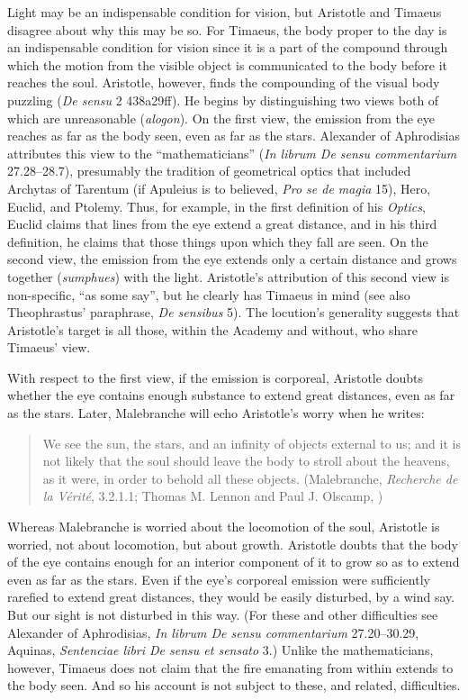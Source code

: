 Light may be an indispensable condition for vision, but Aristotle and Timaeus disagree about why this may be so. For Timaeus, the body proper to the day is an indispensable condition for vision since it is a part of the compound through which the motion from the visible object is communicated to the body before it reaches the soul. Aristotle, however, finds the compounding of the visual body puzzling (\emph{De sensu} 2 438a29ff). He begins by distinguishing two views both of which are unreasonable (\emph{alogon}). On the first view, the emission from the eye reaches as far as the body seen, even as far as the stars. Alexander of Aphrodisias attributes this view to the ``mathematicians'' (\emph{In librum De sensu commentarium} 27.28--28.7), presumably the tradition of geometrical optics that included Archytas of Tarentum (if Apuleius is to believed, \emph{Pro se de magia} 15), Hero, Euclid, and Ptolemy. Thus, for example, in the first definition of his \emph{Optics}, Euclid claims that lines from the eye extend a great distance, and in his third definition, he claims that those things upon which they fall are seen. On the second view, the emission from the eye extends only a certain distance and grows together (\emph{sumphues}) with the light. Aristotle's attribution of this second view is non-specific, ``as some say'', but he clearly has Timaeus in mind (see also Theophrastus' paraphrase, \emph{De sensibus} 5). The locution's generality suggests that Aristotle's target is all those, within the Academy and without, who share Timaeus' view.

With respect to the first view, if the emission is corporeal, Aristotle doubts whether the eye contains enough substance to extend great distances, even as far as the stars. Later, Malebranche will echo Aristotle's worry when he writes:
\begin{quote}
	We see the sun, the stars, and an infinity of objects external to us; and it is not likely that the soul should leave the body to stroll about the heavens, as it were, in order to behold all these objects. (Malebranche, \emph{Recherche de la V\'{e}rit\'{e}}, 3.2.1.1; Thomas M. Lennon and Paul J. Olscamp, \citeyear[217]{Malebranche:1997sf})
\end{quote}
Whereas Malebranche is worried about the locomotion of the soul, Aristotle is worried, not about locomotion, but about growth. Aristotle doubts that the body of the eye contains enough for an interior component of it to grow so as to extend even as far as the stars. Even if the eye's corporeal emission were sufficiently rarefied to extend great distances, they would be easily disturbed, by a wind say. But our sight is not disturbed in this way.  (For these and other difficulties see Alexander of Aphrodisias, \emph{In librum De sensu commentarium} 27.20--30.29, Aquinas, \emph{Sentenciae libri De sensu et sensato} 3.) Unlike the mathematicians, however, Timaeus does not claim that the fire emanating from within extends to the body seen. And so his account is not subject to these, and related, difficulties.

